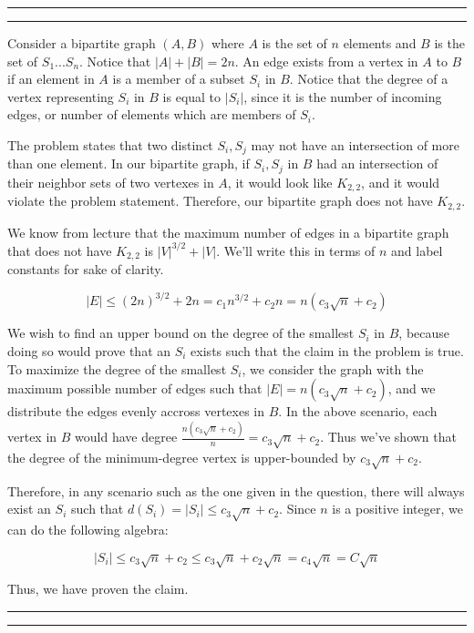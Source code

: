 \documentclass[11pt,letterpaper]{article}
\newcommand{\question}[1] {\vspace{.25in} \hrule\vspace{0.5em}
\noindent{\bf #1} \vspace{0.5em}
\hrule \vspace{.10in}}
\begin{document}
\question{5}

Consider a bipartite graph $(A,B)$ where $A$ is the set of $n$ elements and $B$ is the set of $S_1...S_n$. Notice that $|A| + |B| = 2n$.
An edge exists from a vertex in $A$ to $B$ if an element in $A$ is a member of a subset $S_i$ in $B$. Notice that the degree of a vertex representing $S_i$ in $B$ is equal to $|S_i|$, since it is the number of incoming edges, or number of elements which are members of $S_i$.

The problem states that two distinct $S_i, S_j$ may not have an intersection of more than one element.
In our bipartite graph, if $S_i, S_j$ in $B$ had an intersection of their neighbor sets of two vertexes in $A$, it would look like $K_{2,2}$,
and it would violate the problem statement. Therefore, our bipartite graph does not have $K_{2,2}$.

We know from lecture that the maximum number of edges in a bipartite graph that does not have $K_{2,2}$ is $|V|^{3/2} + |V|$. We'll write this in terms of $n$ and label constants for sake of clarity.

$$ |E| \leq (2n)^{3/2} + 2n = c_1 n^{3/2} + c_2n = n(c_3 \sqrt{n} + c_2) $$

We wish to find an upper bound on the degree of the smallest $S_i$ in $B$, because doing so would prove that an $S_i$ exists such that the claim in the problem is true.
To maximize the degree of the smallest $S_i$, we consider the graph with the maximum possible number of edges such that $|E| = n(c_3 \sqrt{n} + c_2)$, and we distribute the edges evenly accross vertexes in $B$.
In the above scenario, each vertex in $B$ would have degree $\frac{n(c_3 \sqrt{n} + c_2)}{n} = c_3 \sqrt{n} + c_2$. Thus we've shown that the degree of the minimum-degree vertex is upper-bounded by $c_3 \sqrt{n} + c_2$.

Therefore, in any scenario such as the one given in the question, there will always exist an $S_i$ such that $d(S_i) = |S_i| \leq c_3 \sqrt{n} + c_2$.
Since $n$ is a positive integer, we can do the following algebra:

$$|S_i| \leq c_3 \sqrt{n} + c_2 \leq c_3 \sqrt{n} + c_2 \sqrt{n} = c_4 \sqrt{n} = C \sqrt{n}$$

Thus, we have proven the claim.


\question{6}
\end{document}
